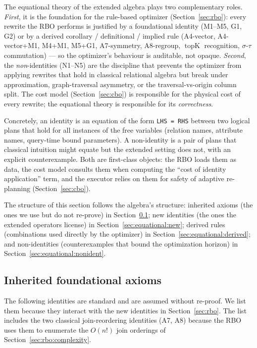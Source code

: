 \documentclass[sigconf,nonacm,review]{acmart}
\theoremstyle{plain}
\theoremstyle{definition}
\newcommand{\topK}{\operatorname{topK}}
\theoremstyle{remark}
\begin{document}
The equational theory of the extended algebra plays two
complementary roles. \emph{First}, it is the foundation for the
rule-based optimizer (Section~\ref{sec:rbo}): every rewrite the
RBO performs is justified by a foundational identity (M1--M5, G1,
G2) or by a derived corollary / definitional / implied rule (A4-vector,
A4-vector+M1, M4+M1, M5+G1, A7-symmetry, A8-regroup, $\topK$
recognition, $\sigma$-$\tau$ commutation) --- so the optimizer's
behaviour is auditable, not opaque. \emph{Second}, the
\emph{non}-identities (N1--N5) are the discipline that prevents
the optimizer from applying rewrites that hold in classical
relational algebra but break under approximation, graph-traversal
asymmetry, or the traversal-vs-origin column split. The cost model
(Section~\ref{sec:cbo}) is responsible for the physical cost of
every rewrite; the equational theory is responsible for its
\emph{correctness}.

Concretely, an identity is an equation of the form
\texttt{LHS = RHS} between two logical plans that hold for all
instances of the free variables (relation names, attribute names,
query-time bound parameters). A non-identity is a pair of plans
that classical intuition might equate but the extended setting
does not, with an explicit counterexample. Both are first-class
objects: the RBO loads them as data, the cost model consults them
when computing the ``cost of identity application'' term, and the
executor relies on them for safety of adaptive re-planning
(Section~\ref{sec:cbo}).

The structure of this section follows the algebra's structure:
inherited axioms (the ones we use but do not re-prove) in
Section~\ref{sec:equational:inherited}; new identities (the ones
the extended operators license) in
Section~\ref{sec:equational:new}; derived rules (combinations used
directly by the optimizer) in
Section~\ref{sec:equational:derived}; and non-identities
(counterexamples that bound the optimization horizon) in
Section~\ref{sec:equational:nonident}.

\subsection{Inherited foundational axioms}\label{sec:equational:inherited}

The following identities are standard and are assumed without
re-proof. We list them because they interact with the new identities
in Section~\ref{sec:rbo}. The list includes the two classical
join-reordering identities (A7, A8) because the RBO uses them to
enumerate the $O(n!)$ join orderings of
Section~\ref{sec:rbo:complexity}.
\end{document}
